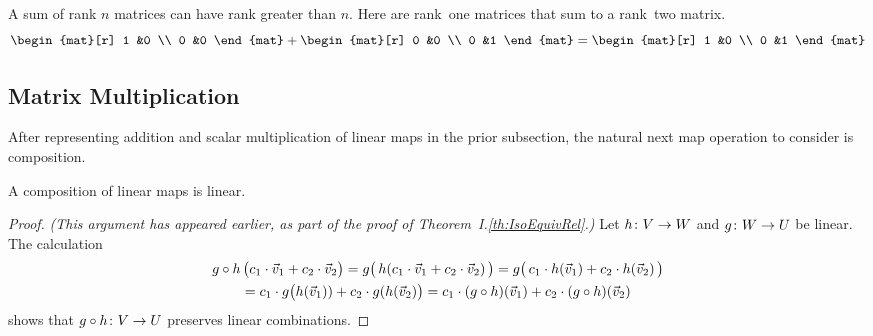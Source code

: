 \begin{exercises}
\begin{answer}
\begin{exparts}
          A sum of rank \( n \) matrices can have rank greater than \( n \).
          Here are rank~one matrices that sum to a rank~two matrix.
          \begin{equation*}
            \begin{mat}[r]
              1  &0  \\
              0  &0
            \end{mat}
            +\begin{mat}[r]
              0  &0  \\
              0  &1
            \end{mat}
            =\begin{mat}[r]
              1  &0  \\
              0  &1
            \end{mat}
          \end{equation*}
      \end{exparts}  
    \end{answer}
\end{exercises}











\subsection{Matrix Multiplication}
After representing addition and scalar multiplication of linear maps
in the prior subsection, the natural next map operation to consider 
is composition.

\begin{lemma}
A composition of linear maps is linear.
\end{lemma}

\begin{proof}
\textit{(This argument has appeared earlier, 
as part of the proof of Theorem~I.\ref{th:IsoEquivRel}.)}  
Let $\mbox{$h\colon V\to W$}$ and $\mbox{$g\colon W\to U$}$ be linear. 
The calculation
\begin{multline*}
  g\mathbin{\circ} h\,\bigl(c_1\cdot\vec{v}_1+c_2\cdot\vec{v}_2\bigr)
     =g\bigl(\,h(c_1\cdot \vec{v}_1+c_2\cdot\vec{v}_2)\,\bigr)        
     =g\bigl(\,c_1\cdot h(\vec{v}_1)+c_2\cdot h(\vec{v}_2)\,\bigr) \\ 
     =c_1\cdot g\bigl(h(\vec{v}_1))+c_2\cdot g(h(\vec{v}_2)\bigr)  
     =c_1\cdot (g\mathbin{\circ} h)(\vec{v}_1)
                   +c_2\cdot (g\mathbin{\circ} h)(\vec{v}_2)
\end{multline*}
shows that $\mbox{$g\mathbin{\circ} h\colon V\to U$}$
preserves linear combinations.
\end{proof}

